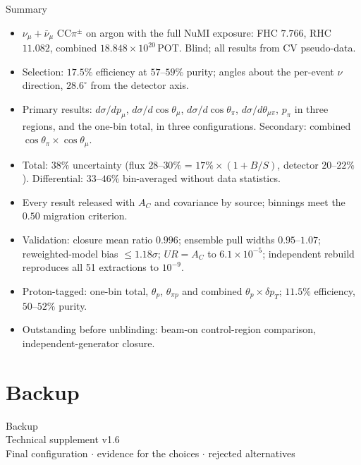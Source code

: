 \documentclass[aspectratio=169,10pt]{beamer}
\newif\ifbackup
\begin{document}
\begin{frame}{Summary}
  \footnotesize
  \begin{itemize}\setlength\itemsep{3pt}
    \item $\nu_\mu+\bar\nu_\mu$ CC$\pi^\pm$ on argon with the full NuMI exposure: FHC $7.766$, RHC $11.082$,
      combined $18.848\times10^{20}$\,POT. Blind; all results from CV pseudo-data.
    \item Selection: $17.5\%$ efficiency at $57$--$59\%$ purity; angles about the per-event $\nu$ direction,
      $28.6^\circ$ from the detector axis.
    \item Primary results: $d\sigma/dp_\mu$, $d\sigma/d\cos\theta_\mu$, $d\sigma/d\cos\theta_\pi$,
      $d\sigma/d\theta_{\mu\pi}$, $p_\pi$ in three regions, and the one-bin total, in three configurations.
      Secondary: combined $\cos\theta_\pi\times\cos\theta_\mu$.
    \item Total: $38\%$ uncertainty (flux $28$--$30\%$ = $17\%\times(1+B/S)$, detector $20$--$22\%$).
      Differential: $33$--$46\%$ bin-averaged without data statistics.
    \item Every result released with $A_C$ and covariance by source; binnings meet the $0.50$ migration criterion.
    \item Validation: closure mean ratio $0.996$; ensemble pull widths $0.95$--$1.07$; reweighted-model
      bias $\le1.18\sigma$; $UR=A_C$ to $6.1\times10^{-5}$; independent rebuild reproduces all 51 extractions to $10^{-9}$.
    \item Proton-tagged: one-bin total, $\theta_p$, $\theta_{\pi p}$ and combined $\theta_p\times\delta p_T$;
      $11.5\%$ efficiency, $50$--$52\%$ purity.
    \item Outstanding before unblinding: beam-on control-region comparison, independent-generator closure.
  \end{itemize}
  \label{mainend}
\end{frame}

\backuptrue
\appendix
\section{Backup}
{
\begin{frame}[plain]
  \centering\vfill
  {\Huge\color{ubred}Backup}\\[4mm]
  {\large Technical supplement v1.6}\\[3mm]
  \small Final configuration $\cdot$ evidence for the choices $\cdot$ rejected alternatives
  \vfill
\end{frame}}
\end{document}

